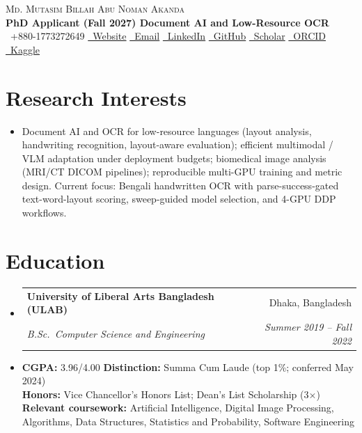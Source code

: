 \documentclass[a4paper,11pt]{article}
\makeatletter
\newcommand{\cvSubheading}[4]{
  \vspace{-1pt}\item
    \begin{tabular*}{0.97\textwidth}{l@{\extracolsep{\fill}}r}
      \textbf{#1} & #2 \\
      \textit{#3} & \textit{#4} \\
    \end{tabular*}\vspace{-5pt}
}
\newcommand{\cvListStart}{\begin{itemize}[leftmargin=*]}
\newcommand{\cvListEnd}{\end{itemize}}
\makeatother
\begin{document}
\begin{center}
    {\LARGE \textsc{Md. Mutasim Billah Abu Noman Akanda}} \\ \vspace{4pt}
    {\small \textbf{PhD Applicant (Fall 2027) \textbullet{} Document AI and Low-Resource OCR}} \\ \vspace{4pt}
    \footnotesize
    \faPhone\ +880-1773272649 \quad
    \href{https://noman024.github.io/}{\faGlobe\ Website} \quad
    \href{mailto:mutasim.billah024@gmail.com}{\faEnvelope\ Email} \quad
    \href{https://www.linkedin.com/in/noman024/}{\faLinkedin\ LinkedIn} \quad
    \href{https://github.com/noman024}{\faGithub\ GitHub} \quad
    \href{https://scholar.google.com/citations?user=kR2bOWMAAAAJ}{\faGlobe\ Scholar} \quad
    \href{https://orcid.org/0009-0006-4981-7822}{\faGlobe\ ORCID} \quad
    \href{https://www.kaggle.com/mutasimbillahnoman}{\faGlobe\ Kaggle}
\end{center}

\section{Research Interests}
\cvListStart
\item[] \small
Document AI and OCR for low-resource languages (layout analysis, handwriting recognition, layout-aware evaluation); efficient multimodal / VLM adaptation under deployment budgets; biomedical image analysis (MRI/CT DICOM pipelines); reproducible multi-GPU training and metric design. Current focus: Bengali handwritten OCR with parse-success-gated text-word-layout scoring, sweep-guided model selection, and 4-GPU DDP workflows.
\cvListEnd

\section{Education}
\cvListStart
\cvSubheading
  {University of Liberal Arts Bangladesh (ULAB)}{Dhaka, Bangladesh}
  {B.Sc.\ Computer Science and Engineering}{Summer 2019 -- Fall 2022}
\item[] \small
  \textbf{CGPA:} 3.96/4.00 \quad \textbf{Distinction:} Summa Cum Laude (top 1\%; conferred May 2024) \\
  \textbf{Honors:} Vice Chancellor's Honors List; Dean's List Scholarship (3$\times$) \\
  \textbf{Relevant coursework:} Artificial Intelligence, Digital Image Processing, Algorithms, Data Structures, Statistics and Probability, Software Engineering
\cvListEnd
\end{document}
